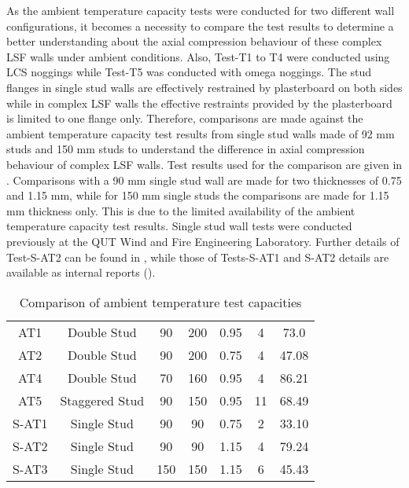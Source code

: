 As the ambient temperature capacity tests were conducted for two different wall configurations, it becomes a necessity to compare the test results to determine a better understanding about the axial compression behaviour of these complex LSF walls under ambient conditions. Also, Test-T1 to T4 were conducted using LCS noggings while Test-T5 was conducted with omega noggings. The stud flanges in single stud walls are effectively restrained by plasterboard on both sides while in complex LSF walls the effective restraints provided by the plasterboard is limited to one flange only. Therefore, comparisons are made against the ambient temperature capacity test results from single stud walls made of 92 mm studs and 150 mm studs to understand the difference in axial compression behaviour of complex LSF walls. Test results used for the comparison are given in . Comparisons with a 90 mm single stud wall are made for two thicknesses of 0.75 and 1.15 mm, while for 150 mm single studs the comparisons are made for 1.15 mm thickness only. This is due to the limited availability of the ambient temperature capacity test results. Single stud wall tests were conducted previously at the QUT Wind and Fire Engineering Laboratory. Further details of Test-S-AT2 can be found in \citet{Gunalan2013e}, while those of Tests-S-AT1 and S-AT2 details are available as internal reports (\cite{Anthonypeer2016}). 
\begin{table}[!htbp]
	\centering
	\caption{Comparison of ambient temperature test capacities}
	\begin{tabular}{ccccccc}
		\toprule
		\multicolumn{1}{m{2.4em}}{\centering{Test Name}} & 
		\multicolumn{1}{m{5.6em}}{\centering{Description}} & 
		\multicolumn{1}{m{2.85em}}{\centering{Stud Depth (mm)}} & 
		\multicolumn{1}{m{2.85em}}{\centering{Cavity Depth (mm)}} & 
		\multicolumn{1}{m{5em}}{\centering{Stud Thickness (mm)}} & 
		\multicolumn{1}{m{3em}}{\centering{No of Studs}} &
		\multicolumn{1}{m{3em}}{\centering{Failure Load (kN)}} \\
		\midrule
		AT1  & Double Stud & 90 & 200 & 0.95 & 4 & 73.0 \\
		AT2  & Double Stud & 90 & 200 & 0.75 & 4 & 47.08 \\
		AT4  & Double Stud & 70 & 160 & 0.95 & 4 & 86.21 \\
		AT5  & Staggered Stud & 90 & 150 & 0.95 & 11 & 68.49 \\
		S-AT1 & Single Stud & 90 & 90 & 0.75 & 2 & 33.10 \\
		S-AT2 & Single Stud & 90 & 90 & 1.15 & 4 & 79.24 \\
		S-AT3 & Single Stud & 150 & 150 & 1.15 & 6 & 45.43 \\
		\bottomrule
	\end{tabular}%
	\label{tab:ambient-test-results-comparison}%
\end{table}%

